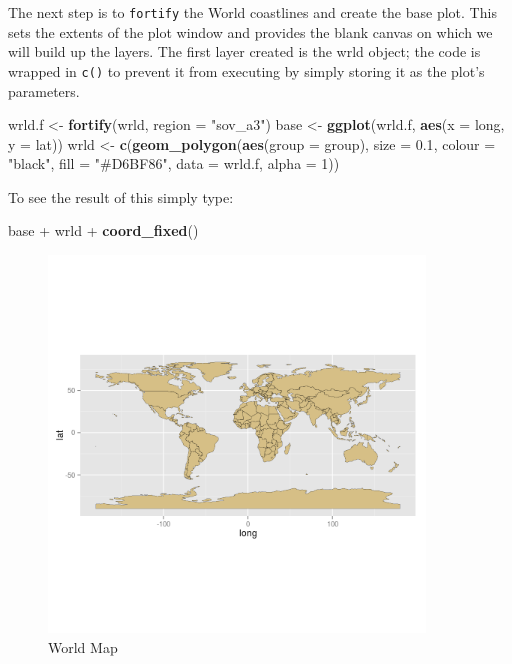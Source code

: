 \documentclass[]{article}
\newenvironment{Shaded}{}{}
\newcommand{\KeywordTok}[1]{\textcolor[rgb]{0.00,0.44,0.13}{\textbf{{#1}}}}
\newcommand{\DataTypeTok}[1]{\textcolor[rgb]{0.56,0.13,0.00}{{#1}}}
\newcommand{\DecValTok}[1]{\textcolor[rgb]{0.25,0.63,0.44}{{#1}}}
\newcommand{\FloatTok}[1]{\textcolor[rgb]{0.25,0.63,0.44}{{#1}}}
\newcommand{\StringTok}[1]{\textcolor[rgb]{0.25,0.44,0.63}{{#1}}}
\newcommand{\NormalTok}[1]{{#1}}
\let\Oldincludegraphics\includegraphics
\renewcommand{\includegraphics}[1]{\Oldincludegraphics[width=10cm]{#1}}
\begin{document}
The next step is to \texttt{fortify} the World coastlines and create the
base plot. This sets the extents of the plot window and provides the
blank canvas on which we will build up the layers. The first layer
created is the wrld object; the code is wrapped in \texttt{c()} to
prevent it from executing by simply storing it as the plot's parameters.

\begin{Shaded}
\begin{Highlighting}[]
\NormalTok{wrld.f <- }\KeywordTok{fortify}\NormalTok{(wrld, }\DataTypeTok{region =} \StringTok{"sov_a3"}\NormalTok{)}
\NormalTok{base <- }\KeywordTok{ggplot}\NormalTok{(wrld.f, }\KeywordTok{aes}\NormalTok{(}\DataTypeTok{x =} \NormalTok{long, }\DataTypeTok{y =} \NormalTok{lat))}
\NormalTok{wrld <- }\KeywordTok{c}\NormalTok{(}\KeywordTok{geom_polygon}\NormalTok{(}\KeywordTok{aes}\NormalTok{(}\DataTypeTok{group =} \NormalTok{group), }\DataTypeTok{size =} \FloatTok{0.1}\NormalTok{, }\DataTypeTok{colour =} \StringTok{"black"}\NormalTok{, }\DataTypeTok{fill =} \StringTok{"#D6BF86"}\NormalTok{, }
    \DataTypeTok{data =} \NormalTok{wrld.f, }\DataTypeTok{alpha =} \DecValTok{1}\NormalTok{))}
\end{Highlighting}
\end{Shaded}

To see the result of this simply type:

\begin{Shaded}
\begin{Highlighting}[]
\NormalTok{base + wrld + }\KeywordTok{coord_fixed}\NormalTok{()}
\end{Highlighting}
\end{Shaded}

\begin{figure}[htbp]
\centering
\includegraphics{figure/World_Map.png}
\caption{World Map}
\end{figure}
\end{document}
